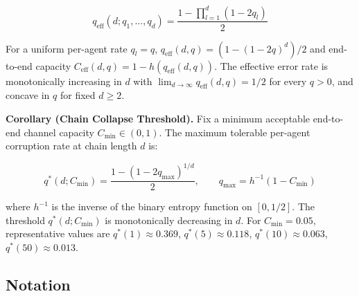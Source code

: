 \documentclass[11pt]{article}
\begin{document}
\[q_{\text{eff}}(d; q_1, \ldots, q_d) = \frac{1 - \prod_{l=1}^{d} (1 - 2 q_l)}{2}\]

For a uniform per-agent rate \(q_l = q\),
\(q_{\text{eff}}(d, q) = (1 - (1 - 2q)^d)/2\) and end-to-end capacity
\(C_{\text{eff}}(d, q) = 1 - h(q_{\text{eff}}(d, q))\). The effective
error rate is monotonically increasing in \(d\) with
\(\lim_{d \to \infty} q_{\text{eff}}(d, q) = 1/2\) for every \(q > 0\),
and concave in \(q\) for fixed \(d \geq 2\).

\textbf{Corollary (Chain Collapse Threshold).} Fix a minimum acceptable
end-to-end channel capacity \(C_{\min} \in (0, 1)\). The maximum
tolerable per-agent corruption rate at chain length \(d\) is:

\[q^*(d; C_{\min}) = \frac{1 - (1 - 2 q_{\max})^{1/d}}{2}, \qquad q_{\max} = h^{-1}(1 - C_{\min})\]

where \(h^{-1}\) is the inverse of the binary entropy function on
\([0, 1/2]\). The threshold \(q^*(d; C_{\min})\) is monotonically
decreasing in \(d\). For \(C_{\min} = 0.05\), representative values are
\(q^*(1) \approx 0.369\), \(q^*(5) \approx 0.118\),
\(q^*(10) \approx 0.063\), \(q^*(50) \approx 0.013\).

\subsection{Notation}\label{notation}
\end{document}
